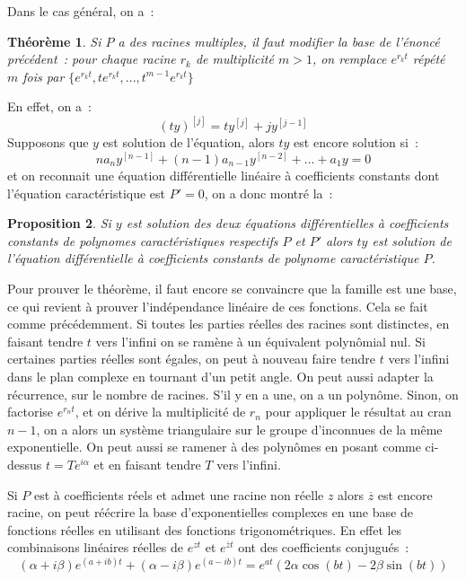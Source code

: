 \documentclass[a4paper,11pt]{book}
\newtheorem{thm}{Théorème}
\newtheorem{prop}[thm]{Proposition}
\begin{document}
\begin{giacjshere}
Dans le cas g\'en\'eral, on a~:
\begin{thm}
Si $P$ a des racines multiples, il faut modifier la base
de l'\'enonc\'e pr\'ec\'edent~: pour chaque
racine $r_k$ de multiplicit\'e $m>1$, on remplace $e^{r_kt}$
r\'ep\'et\'e $m$ fois par
$\{ e^{r_kt}, te^{r_kt}, ..., t^{m-1} e^{r_kt} \}$
\end{thm}
En effet, on a~:
$$ (ty)^{[j]} = t y^{[j]} + j y^{[j-1]}$$
Supposons que $y$ est solution de l'\'equation, 
alors $ty$ est encore solution si~:
$$na_n y^{[n-1]} + (n-1)a_{n-1} y^{[n-2]}+...+a_1y=0$$
et on reconnait une \'equation diff\'erentielle lin\'eaire \`a coefficients
constants dont l'\'equation caract\'eristique est $P'=0$, on a donc
montr\'e la~:
\begin{prop}
Si $y$ est solution des deux \'equations diff\'erentielles \`a coefficients
constants de polynomes caract\'eristiques respectifs $P$ et $P'$ alors
$ty$ est solution de l'\'equation diff\'erentielle \`a coefficients
constants de polynome caract\'eristique $P$.
\end{prop}
Pour prouver le th\'eor\`eme, il faut encore se convaincre que la
famille est une base, ce qui revient
\`a prouver l'ind\'ependance lin\'eaire de ces fonctions.
Cela se fait comme pr\'ec\'edemment. Si toutes les parties r\'eelles
des racines sont distinctes, en faisant tendre $t$ vers
l'infini on se ram\`ene \`a un \'equivalent polyn\^omial nul.
Si certaines parties r\'eelles sont \'egales, on peut \`a nouveau
faire tendre $t$ vers l'infini dans le plan complexe en
tournant d'un petit angle. On peut aussi adapter la r\'ecurrence,
sur le nombre de racines. S'il y
en a une, on a un polyn\^ome. Sinon, on factorise $e^{r_nt}$,
et on d\'erive la multiplicit\'e de $r_n$ pour appliquer
le r\'esultat au cran $n-1$, on a alors un syst\`eme triangulaire
sur le groupe d'inconnues de la m\^eme exponentielle. On peut aussi
se ramener \`a des polyn\^omes en posant comme ci-dessus
$t=Te^{i\alpha}$ et en faisant tendre $T$ vers l'infini.

Si $P$ est \`a coefficients r\'eels et admet une racine non r\'eelle
$z$ alors $\overline{z}$ est encore racine, on peut r\'e\'ecrire 
la base d'exponentielles complexes en une base
de fonctions r\'eelles en utilisant des fonctions trigonom\'etriques.
En effet les combinaisons lin\'eaires r\'eelles
de $e^{zt}$ et $e^{\overline{z}t}$ ont des coefficients conjugu\'es~:
$$ (\alpha + i \beta) e^{(a+ib)t} + (\alpha - i \beta)  e^{(a-ib)t}
=  e^{at} ( 2 \alpha \cos(bt) - 2 \beta \sin(bt) )$$


\end{giacjshere}
\end{document}

